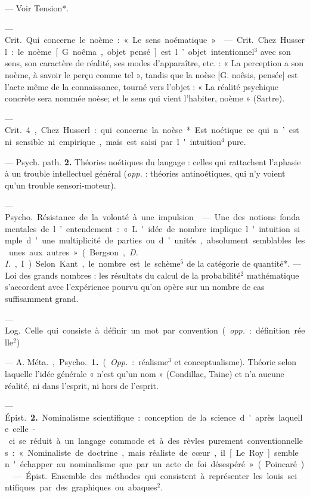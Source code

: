 \begin{itemize}[leftmargin=1cm, label=, itemsep=1pt]
 — Voir Tension*.

 — \si{Crit.} Qui concerne le
noème : « Le sens noématique. »

 — \si{Crit.} Chez Husserl :
le noème [G. noêma, objet pensé]
est l’objet intentionnel$^3$ avec son
sens, son caractère de réalité, ses
modes d’apparaître, etc. : « La perception a son noème, à savoir le
perçu comme tel », tandis que la
noèse [G. noêsis, pensée] est l’acte
même de la connaissance, tourné
vers l'objet : « La réalité psychique
concrète sera nommée noèse; et le
sens qui vient l'habiter, noème »
(Sartre).

 — \si{Crit.} 4, Chez Husserl : qui
concerne la noèse*. Est noétique ce
qui n’est ni sensible ni empirique,
mais est saisi par l'intuition$^4$ pure.

— Psych. path. {\bf 2.} Théories noétiques du langage : celles qui rattachent l’aphasie à un trouble intellectuel général ({\it opp.} : théories antinoétiques, qui n’y voient qu'un
trouble sensori-moteur).

 — \si{Psycho.} Résistance de la
volonté à une impulsion.

 — Une des notions fondamentales de l’entendement : « L'idée
de nombre implique l'intuition
simple d’une multiplicité de parties
ou d’unités, absolument semblables
les unes aux autres » (Bergson,
{\it D. I.}, I). Selon Kant, le nombre est
le schème$^5$ de la catégorie de quantité*. — Loi des grands nombres : les
résultats du calcul de la probabilité$^2$
mathématique s'accordent avec
l'expérience pourvu qu'on opère sur
un nombre de cas suffisamment
grand.

 — \si{Log.} Celle
qui consiste à définir un mot par
convention ({\it opp.} : définition réelle$^2$)

 — A. \si{Méta.}, \si{Psycho.} {\bf 1.}
({\it Opp.} : réalisme$^3$ et conceptualisme).
Théorie selon laquelle l’idée générale
« n’est qu’un nom » (Condillac,
Taine) et n'a aucune réalité, ni dans
l'esprit, ni hors de l'esprit.

— \si{Épist.} {\bf 2.} Nominalisme scientifique : conception de la science
d'après laquelle celle-ci se réduit
à un langage commode et à des
rèvles purement conventionnelles :
« Nominaliste de doctrine, mais réaliste de cœur, il [Le Roy] semble
n'échapper au nominalisme que par
un acte de foi désespéré » (Poincaré).

 — \si{Épist.} Ensemble des
méthodes qui consistent à représenter les louis sci ntifiques par des
graphiques ou abaques$^2$.


\end{itemize}

